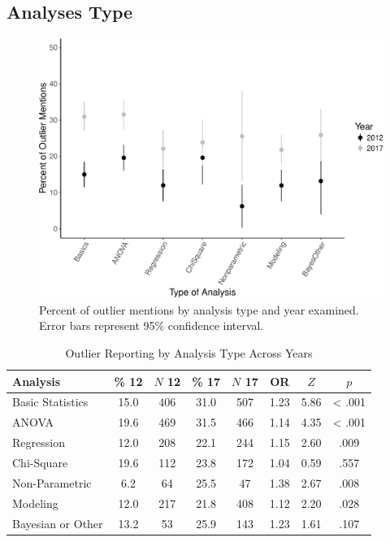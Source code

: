 \documentclass[english,man]{apa6}
\theoremstyle{definition}
\theoremstyle{definition}
\theoremstyle{definition}
\theoremstyle{remark}
\begin{document}
\subsection{Analyses Type}\label{analyses-type}

\begin{figure}
\centering
\includegraphics{outliers_manuscript_files/figure-latex/analyses-graph-1.pdf}
\caption{\label{fig:analyses-graph}Percent of outlier mentions by analysis
type and year examined. Error bars represent 95\% confidence interval.}
\end{figure}

\begin{table}[tbp]
\begin{center}
\begin{threeparttable}
\caption{\label{tab:analysis-table}Outlier Reporting by Analysis Type Across Years}
\begin{tabular}{lccccccc}
\toprule
Analysis & \% 12 & $N$ 12 & \% 17 & $N$ 17 & OR & $Z$ & $p$\\
\midrule
Basic Statistics & 15.0 & 406 & 31.0 & 507 & 1.23 & 5.86 & < .001\\
ANOVA & 19.6 & 469 & 31.5 & 466 & 1.14 & 4.35 & < .001\\
Regression & 12.0 & 208 & 22.1 & 244 & 1.15 & 2.60 & .009\\
Chi-Square & 19.6 & 112 & 23.8 & 172 & 1.04 & 0.59 & .557\\
Non-Parametric & 6.2 & 64 & 25.5 & 47 & 1.38 & 2.67 & .008\\
Modeling & 12.0 & 217 & 21.8 & 408 & 1.12 & 2.20 & .028\\
Bayesian or Other & 13.2 & 53 & 25.9 & 143 & 1.23 & 1.61 & .107\\
\bottomrule
\end{tabular}
\end{threeparttable}
\end{center}
\end{table}
\end{document}
